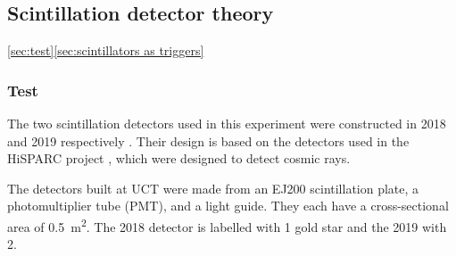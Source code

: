 \documentclass[11pt]{article}
\numberwithin{equation}{section}
\numberwithin{figure}{section}
\numberwithin{table}{section}
\begin{document}
\subsection{Scintillation detector theory}\label{sec:scintillator theory}
\autoref{sec:test}\autoref{sec:scintillators as triggers}
\subsubsection{Test}\label{sec:test}
\par The two scintillation detectors used in this experiment were constructed in 2018 and 2019 respectively \cite{2018 report}\cite{2019 report}. Their design is based on the detectors used in the HiSPARC project \cite{HISPARC}, which were designed to detect cosmic rays. 
\par The detectors built at UCT were made from an EJ200 scintillation plate, a photomultiplier tube (PMT), and a light guide. They each have a cross-sectional area of \SI{0.5}{\metre^2}. The 2018 detector is labelled with 1 gold star and the 2019 with 2.

\end{document}
